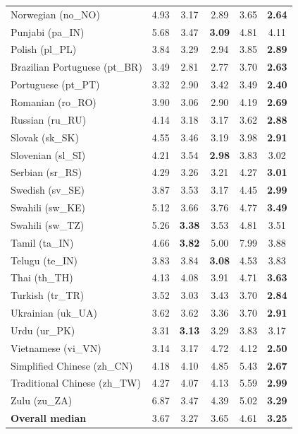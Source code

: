 \begin{longtable}{@{}lccccc@{}}
    Norwegian (no\_NO) & 4.93 & 3.17 & 2.89 & 3.65 & \textbf{2.64} \\
    Punjabi (pa\_IN) & 5.68 & 3.47 & \textbf{3.09} & 4.81 & 4.11 \\
    Polish (pl\_PL) & 3.84 & 3.29 & 2.94 & 3.85 & \textbf{2.89} \\
    Brazilian Portuguese (pt\_BR) & 3.49 & 2.81 & 2.77 & 3.70 & \textbf{2.63} \\
    Portuguese (pt\_PT) & 3.32 & 2.90 & 3.42 & 3.49 & \textbf{2.40} \\
    Romanian (ro\_RO) & 3.90 & 3.06 & 2.90 & 4.19 & \textbf{2.69} \\
    Russian (ru\_RU) & 4.14 & 3.18 & 3.17 & 3.62 & \textbf{2.88} \\
    Slovak (sk\_SK) & 4.55 & 3.46 & 3.19 & 3.98 & \textbf{2.91} \\
    Slovenian (sl\_SI) & 4.21 & 3.54 & \textbf{2.98} & 3.83 & 3.02 \\
    Serbian (sr\_RS) & 4.29 & 3.26 & 3.21 & 4.27 & \textbf{3.01} \\
    Swedish (sv\_SE) & 3.87 & 3.53 & 3.17 & 4.45 & \textbf{2.99} \\
    Swahili (sw\_KE) & 5.12 & 3.66 & 3.76 & 4.77 & \textbf{3.49} \\
    Swahili (sw\_TZ) & 5.26 & \textbf{3.38} & 3.53 & 4.81 & 3.51 \\
    Tamil (ta\_IN) & 4.66 & \textbf{3.82} & 5.00 & 7.99 & 3.88 \\
    Telugu (te\_IN) & 3.83 & 3.84 & \textbf{3.08} & 4.53 & 3.83 \\
    Thai (th\_TH) & 4.13 & 4.08 & 3.91 & 4.71 & \textbf{3.63} \\
    Turkish (tr\_TR) & 3.52 & 3.03 & 3.43 & 3.70 & \textbf{2.84} \\
    Ukrainian (uk\_UA) & 3.62 & 3.62 & 3.36 & 3.70 & \textbf{2.91} \\
    Urdu (ur\_PK) & 3.31 & \textbf{3.13} & 3.29 & 3.83 & 3.17 \\
    Vietnamese (vi\_VN) & 3.14 & 3.17 & 4.72 & 4.12 & \textbf{2.50} \\
    Simplified Chinese (zh\_CN) & 4.18 & 4.10 & 4.85 & 5.43 & \textbf{2.67} \\
    Traditional Chinese (zh\_TW) & 4.27 & 4.07 & 4.13 & 5.59 & \textbf{2.99} \\
    Zulu (zu\_ZA) & 6.87 & 3.47 & 4.39 & 5.02 & \textbf{3.29} \\
    \midrule
    \textbf{Overall median} & 3.67 & 3.27 & 3.65 & 4.61 & \textbf{3.25} \\
\end{longtable}
\endgroup

